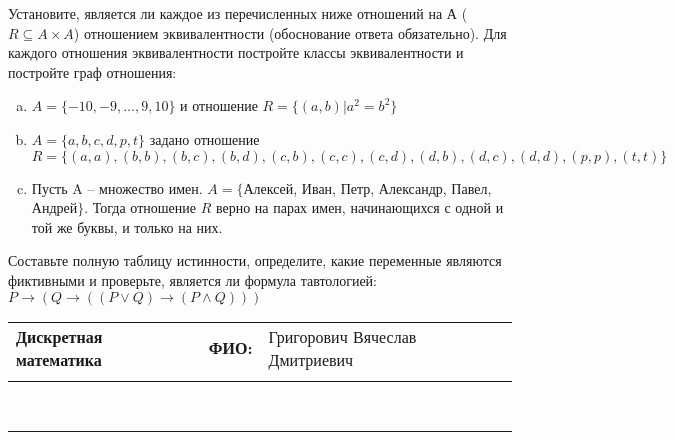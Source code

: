 \documentclass[10pt]{exam}
\newcommand{\class}{Дискретная математика}
\newcommand{\examdate}{}
\begin{document}
\begin{questions}
\question
Установите, является ли каждое из перечисленных ниже отношений на А ($R \subseteq A \times A$) отношением эквивалентности (обоснование ответа обязательно). Для каждого отношения эквивалентности постройте классы 
эквивалентности и постройте граф отношения:
\begin{enumerate} [a)]\setcounter{enumi}{0}
\item $A = \{-10, -9, … , 9, 10\}$ и отношение $R = \{(a,b)|a^{2} = b^{2}\}$
\item $A = \{a, b, c, d, p, t\}$ задано отношение $R = \{(a, a), (b, b), (b, c), (b, d), (c, b), (c, c), (c, d), (d, b), (d, c), (d, d), (p,p), (t,t)\}$
\item Пусть A – множество имен. $A = \{ $Алексей, Иван, Петр, Александр, Павел, Андрей$ \}$. Тогда отношение $R$ верно на парах имен, начинающихся с одной и той же буквы, и только на них.
\end{enumerate}\question Составьте полную таблицу истинности, определите, какие переменные являются фиктивными и проверьте, является ли формула тавтологией:
$ P \rightarrow (Q \rightarrow ((P \lor Q) \rightarrow (P \land Q)))$

\end{questions}
\newpage
\begin{flushright}
\begin{tabular}{p{2.8in} r l}
\textbf{\class} & \textbf{ФИО:} &Григорович Вячеслав Дмитриевич
\\

\textbf{\examdate} &&\\
\end{tabular}\\
\end{flushright}
\rule[1ex]{\textwidth}{.1pt}
\end{document}
